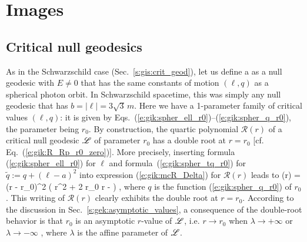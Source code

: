 
\section{Images}

\subsection{Critical null geodesics}

As in the Schwarzschild case (Sec.~\ref{s:gis:crit_geod}), let us define
a 
as a null geodesic with $E\neq 0$ that has the same constants of motion
$(\ell,q)$ as a spherical photon orbit. In Schwarzschild spacetime,
this was simply any null geodesic that has $b = |\ell| = 3\sqrt{3}\, m$.
Here we have a 1-parameter family of critical values $(\ell,q)$:
it is given by Eqs.~(\ref{e:gik:spher_ell_r0})--(\ref{e:gik:spher_q_r0}), the
parameter being $r_0$. By construction, the quartic polynomial $\mathcal{R}(r)$
of a critical null geodesic $\mathscr{L}$ of parameter $r_0$ has a double root at $r=r_0$
[cf. Eq.~(\ref{e:gik:R_Rp_r0_zero})]. More precisely, inserting formula
(\ref{e:gik:spher_ell_r0}) for $\ell$ and formula~(\ref{e:gik:spher_tq_r0})
for $\tilde{q} := q + (\ell - a)^2$
into expression (\ref{e:gik:mcR_Delta}) for $\mathcal{R}(r)$ leads to
\be \label{e:gik:mR_critical_null}
    (r) = (r - r_0)^2 \left( r^2 + 2 r_0 r -  \right) ,
\ee
where $q$ is the function (\ref{e:gik:spher_q_r0}) of $r_0$.
This writing of $\mathcal{R}(r)$ clearly exhibits the double root at $r=r_0$.
According to the discussion in Sec.~\ref{s:gek:asymptotic_values},
a consequence of the double-root behavior is that
$r_0$ is an asymptotic $r$-value of $\mathscr{L}$, i.e. $r\to r_0$
when $\lambda\to+\infty$ or $\lambda\to-\infty$ , where $\lambda$ is the affine
parameter of $\mathscr{L}$.

